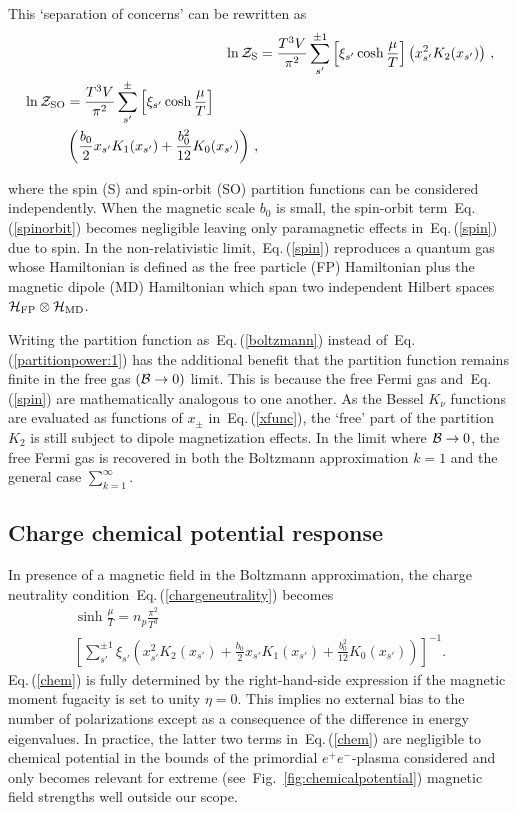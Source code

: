 \documentclass[aps,prd,floatfix,reprint]{revtex4-2}
\newcommand{\req}[1]{Eq.\,(\ref{#1})}
\newcommand{\rf}[1]{Fig.~{\ref{#1}}}
\begin{document}
This `separation of concerns' can be rewritten as
\begin{align}
 \label{spin}
 \ln{\cal Z}_{\rm S}&=\frac{T^{3}V}{\pi^{2}}\sum_{s'}^{\pm1}\left[\xi_{s'}\cosh{\frac{\mu}{T}}\right]\left(x_{s'}^{2}K_{2}(x_{s'})\right)\,,\\
 \begin{split}
 \label{spinorbit}
 \ln{\cal Z}_{\rm SO}&=\frac{T^{3}V}{\pi^{2}}\sum_{s'}^{\pm}\left[\xi_{s'}\cosh{\frac{\mu}{T}}\right]\\
 &\left(\frac{b_{0}}{2}x_{s'}K_{1}(x_{s'})+\frac{b_{0}^{2}}{12}K_{0}(x_{s'})\right)\,, 
 \end{split}
\end{align}

where the spin (S) and spin-orbit (SO) partition functions can be considered independently. When the magnetic scale $b_{0}$ is small, the spin-orbit term~\req{spinorbit} becomes negligible leaving only paramagnetic effects in~\req{spin} due to spin. In the non-relativistic limit,~\req{spin} reproduces a quantum gas whose Hamiltonian is defined as the free particle (FP) Hamiltonian plus the magnetic dipole (MD) Hamiltonian which span two independent Hilbert spaces ${\cal H}_{\rm FP}\otimes{\cal H}_{\rm MD}$.

Writing the partition function as~\req{boltzmann} instead of~\req{partitionpower:1} has the additional benefit that the partition function remains finite in the free gas $({\cal B}\rightarrow0)$ limit. This is because the free Fermi gas and~\req{spin} are mathematically analogous to one another. As the Bessel $K_{\nu}$ functions are evaluated as functions of $x_{\pm}$ in~\req{xfunc}, the `free' part of the partition $K_{2}$ is still subject to dipole magnetization effects. In the limit where ${\cal B}\rightarrow0$, the free Fermi gas is recovered in both the Boltzmann approximation $k=1$ and the general case $\sum_{k=1}^{\infty}$.

\subsection{Charge chemical potential response}
\label{sec:chem}
\noindent In presence of a magnetic field in the Boltzmann approximation, the charge neutrality condition~\req{chargeneutrality} becomes
\begin{multline}
 \label{chem}
 \sinh\frac{\mu}{T}=n_{p}\frac{\pi^{2}}{T^{3}}\\
 \left[\sum_{s'}^{\pm1}\xi_{s'}\!\left(\!x_{s'}^{2}K_{2}(x_{s'})\!+\!\frac{b_{0}}{2}x_{s'}K_{1}(x_{s'})\!+\!\frac{b_{0}^{2}}{12}K_{0}(x_{s'}\!)\!\right)\!\right]^{-1}\!.
\end{multline}
\req{chem} is fully determined by the right-hand-side expression if the magnetic moment fugacity is set to unity $\eta=0$. This implies no external bias to the number of polarizations except as a consequence of the difference in energy eigenvalues. In practice, the latter two terms in~\req{chem} are negligible to chemical potential in the bounds of the primordial $e^{+}e^{-}$-plasma considered and only becomes relevant for extreme (see~\rf{fig:chemicalpotential}) magnetic field strengths well outside our scope.
\end{document}
